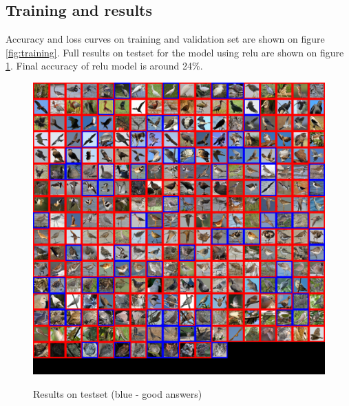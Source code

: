 \documentclass[a4paper]{article}
\begin{document}
\subsection{Training and results}
Accuracy and loss curves on training and validation set are shown on figure \ref{fig:training}.
Full results on testset for the model using relu are shown on figure \ref{fig:eval}.
Final accuracy of relu model is around 24\%.

\begin{figure}[h]
    \caption[]{Results on testset (blue - good answers)}
    \centering
    \includegraphics[page=2,width=1.0\textwidth]{eval.png}
    \label{fig:eval}
\end{figure}
\end{document}
